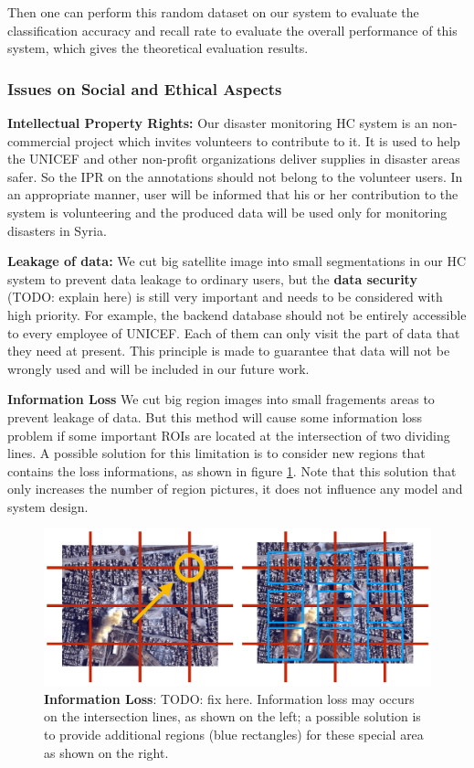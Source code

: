 Then one can perform this random dataset on our system to evaluate the classification accuracy and recall rate to
evaluate the overall performance of this system, which gives the theoretical evaluation results.

\subsubsection{Issues on Social and Ethical Aspects}
\label{chapter:ethical}

\textbf{Intellectual Property Rights:} 
Our disaster monitoring HC system is an non-commercial project which invites volunteers to contribute to it. 
It is used to help the UNICEF and other non-profit organizations deliver supplies in disaster areas safer. 
So the IPR on the annotations should not belong to the volunteer users. In an appropriate manner, user will be informed that 
his or her contribution to the system is volunteering and the produced data will be used only for 
monitoring disasters in Syria.

\textbf{Leakage of data:} 
We cut big satellite image into small segmentations in our HC system to prevent data leakage to ordinary users, 
but the \textbf{data security} (TODO: explain here) is still very important and needs to be considered with high priority. For example, 
the backend database should not be entirely accessible to every employee of UNICEF. 
Each of them can only visit the part of data that they need at present. This principle is made to guarantee 
that data will not be wrongly used and will be included in our future work.

\textbf{Information Loss}
We cut big region images into small fragements areas to prevent leakage of data. 
But this method will cause some information loss problem if some important ROIs are 
located at the intersection of two dividing lines.
A possible solution for this limitation is to consider new regions that contains the loss
informations, as shown in figure \ref{fig:information_loss}. Note that this solution that
only increases the number of region pictures, it does not influence any model and system design.

\begin{figure}[htp]
\centering
\includegraphics[width=0.7\columnwidth]{figures/information_loss2}
\caption{\textbf{Information Loss}: TODO: fix here. Information loss may occurs on the intersection lines, as shown on the left; a possible solution
is to provide additional regions (blue rectangles) for these special area as shown on the right.}
\label{fig:information_loss}
\end{figure}

